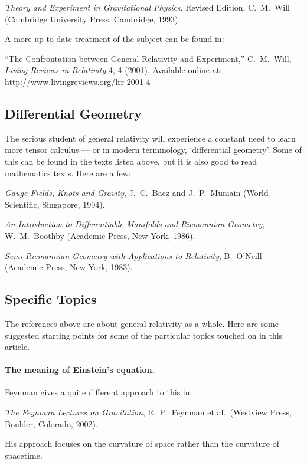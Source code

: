 \medskip
\noindent 
{\it Theory and Experiment in Gravitational Physics}, Revised Edition,
C.\ M.\ Will
(Cambridge University Press, Cambridge, 1993).

\medskip
\noindent
A more up-to-date treatment of the subject can be found in:

\medskip
\noindent 
``The Confrontation between General Relativity and Experiment,''
C.\ M.\ Will, 
{\it Living Reviews in Relativity} 4,  4 (2001). 
Available online at:
\hfill \break
http://www.livingreviews.org/lrr-2001-4


\subsection*{Differential Geometry}

The serious student of general relativity will experience a
constant need to learn more tensor calculus --- or in modern
terminology, `differential geometry'.  Some of this can be found
in the texts listed above, but it is also good to read
mathematics texts.  Here are a few:

\medskip
\noindent 
{\it Gauge Fields, Knots and Gravity},
J.\ C.\ Baez and J.\ P.\ Muniain
(World Scientific, Singapore, 1994).

\medskip
\noindent 
{\it An Introduction to Differentiable Manifolds and Riemannian Geometry}, 
W.\ M.\ Boothby
(Academic Press, New York, 1986).

\medskip
\noindent
{\it Semi-Riemannian Geometry with Applications to Relativity}, 
B.\ O'Neill
(Academic Press, New York, 1983).

\subsection*{Specific Topics}

The references above are about general relativity as a whole.  Here
are some suggested starting points for some of the particular topics
touched on in this article.

\paragraph{The meaning of Einstein's equation.}
Feynman gives a quite different approach to this in:

\medskip
\noindent
{\it The Feynman Lectures on Gravitation}, R.\ P.\ Feynman et al.\ 
(Westview Press, Boulder, Colorado, 2002).

\medskip
\noindent
His approach focuses on the curvature of space rather than the
curvature of spacetime.

